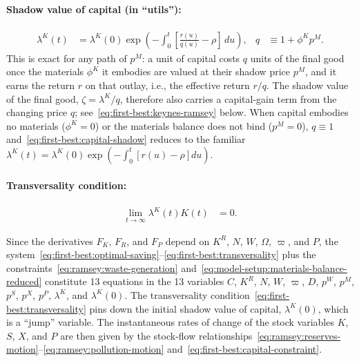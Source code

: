 \paragraph{Shadow value of capital (in ``utils''):}
\begin{align}
\lambda^K(t) &= \lambda^K(0)
\exp\left(-\int_0^t \left[\frac{r(u)}{q(u)}-\rho\right]\,du\right),
&
q &\equiv 1+\phi^Kp^M.
\label{eq:first-best:capital-shadow}
\end{align}
This is exact for any path of $p^M$: a unit of capital costs $q$ units of the final good once the materials $\phi^K$ it embodies are valued at their shadow price $p^M$, and it earns the return $r$ on that outlay, i.e., the effective return $r/q$. The shadow value of the final good, $\zeta=\lambda^K/q$, therefore also carries a capital-gain term from the changing price $q$; see~\eqref{eq:first-best:keynes-ramsey} below. When capital embodies no materials ($\phi^K=0$) or the materials balance does not bind ($p^M=0$), $q\equiv1$ and~\eqref{eq:first-best:capital-shadow} reduces to the familiar $\lambda^K(t)=\lambda^K(0)\exp\left(-\int_0^t[r(u)-\rho]du\right)$.

\paragraph{Transversality condition:}
\begin{align}
\lim_{t\to\infty} \lambda^K(t)K(t) &= 0.
\label{eq:first-best:transversality}
\end{align}

Since the derivatives $F_K$, $F_R$, and $F_P$ depend on $K^R$, $N$, $W$, $\Omega$, $\varpi$, and $P$, the system~\eqref{eq:first-best:optimal-saving}--\eqref{eq:first-best:transversality} plus the constraints~\eqref{eq:ramsey:waste-generation} and~\eqref{eq:model-setup:materials-balance-reduced} constitute 13 equations in the 13 variables $C$, $K^R$, $N$, $W$, $\varpi$, $D$, $p^W$, $p^M$, $p^S$, $p^X$, $p^P$, $\lambda^K$, and $\lambda^K(0)$. The transversality condition~\eqref{eq:first-best:transversality} pins down the initial shadow value of capital, $\lambda^K(0)$, which is a ``jump'' variable. The instantaneous rates of change of the stock variables $K$, $S$, $X$, and $P$ are then given by the stock-flow relationships~\eqref{eq:ramsey:reserves-motion}--\eqref{eq:ramsey:pollution-motion} and~\eqref{eq:first-best:capital-constraint}.

